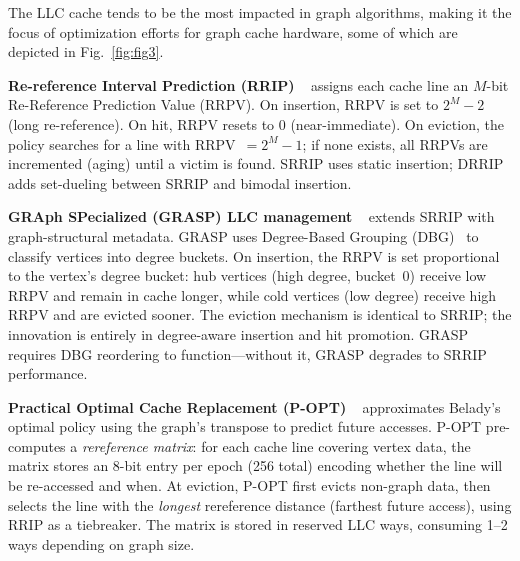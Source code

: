 \documentclass[conference]{IEEEtran}
\newcommand*\circled[1]{\tikz[baseline=(char.base)]{
            \node[shape=circle,draw,inner sep=0.30pt] (char) {#1};}}
\begin{document}


The LLC cache tends to be the most impacted in graph algorithms, making it the focus of optimization efforts for graph cache hardware, some of which are depicted in Fig.~\ref{fig:fig3}.

\textbf{Re-reference Interval Prediction (RRIP)} \circled{\textcolor{BrickRed}A}~\cite{jaleel_high_2010} assigns each cache line an $M$-bit Re-Reference Prediction Value (RRPV). On insertion, RRPV is set to $2^M - 2$ (long re-reference). On hit, RRPV resets to 0 (near-immediate). On eviction, the policy searches for a line with RRPV~$= 2^M - 1$; if none exists, all RRPVs are incremented (aging) until a victim is found. SRRIP uses static insertion; DRRIP~\cite{jaleel_high_2010} adds set-dueling between SRRIP and bimodal insertion.

\textbf{GRAph SPecialized (GRASP) LLC management} \circled{\textcolor{NavyBlue}B}~\cite{faldu_domain-specialized_2020,faldu_closer_2020} extends SRRIP with graph-structural metadata. GRASP uses Degree-Based Grouping (DBG)~\cite{faldu_closer_2020} to classify vertices into degree buckets. On insertion, the RRPV is set proportional to the vertex's degree bucket: hub vertices (high degree, bucket~0) receive low RRPV and remain in cache longer, while cold vertices (low degree) receive high RRPV and are evicted sooner. The eviction mechanism is identical to SRRIP; the innovation is entirely in degree-aware insertion and hit promotion. GRASP requires DBG reordering to function---without it, GRASP degrades to SRRIP performance.

\textbf{Practical Optimal Cache Replacement (P-OPT)} \circled{\textcolor{Green}C}~\cite{balaji_p-opt_2021} approximates Belady's optimal policy using the graph's transpose to predict future accesses. P-OPT pre-computes a \emph{rereference matrix}: for each cache line covering vertex data, the matrix stores an 8-bit entry per epoch (256 total) encoding whether the line will be re-accessed and when. At eviction, P-OPT first evicts non-graph data, then selects the line with the \emph{longest} rereference distance (farthest future access), using RRIP as a tiebreaker. The matrix is stored in reserved LLC ways, consuming 1--2 ways depending on graph size.


\end{document}
